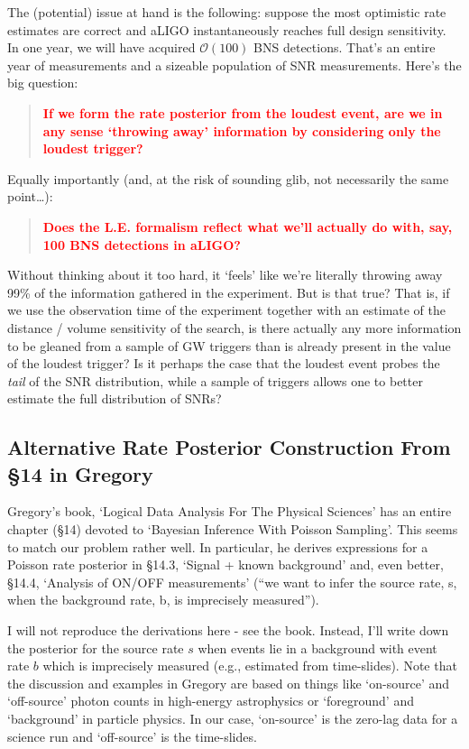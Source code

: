 \documentclass[nofootinbib]{revtex4}
\begin{document}
%
The (potential) issue at hand is the following: suppose the most
optimistic rate estimates are correct and aLIGO instantaneously reaches full
design sensitivity.  In one year, we will have acquired ${\mathcal O}(100)$ BNS
detections.  That's an entire year of measurements and a sizeable population of
SNR measurements.  Here's the big question: 
\begin{quote}
{\bf \textcolor{red}{If we form the rate
posterior from the loudest event, are we in any sense `throwing away'
information by considering only the loudest trigger?}}
\end{quote}
Equally importantly (and, at the risk of sounding glib, not necessarily the same
point\dots):
\begin{quote}
{\bf \textcolor{red}{Does the L.E. formalism reflect what we'll actually do
with, say, 100 BNS detections in aLIGO?}}
\end{quote}

Without thinking about it too hard, it `feels' like we're literally throwing
away 99\% of the information gathered in the experiment.  But is that true?
That is, if we use the observation time of the experiment together with an
estimate of the distance / volume sensitivity of the search, is there actually
any more information to be gleaned from a sample of GW triggers than is already
present in the value of the loudest trigger?  Is it perhaps the case that the
loudest event probes the \emph{tail} of the SNR distribution, while a sample
of triggers allows one to better estimate the full distribution of SNRs?

\subsection{Alternative Rate Posterior Construction From \S 14 in Gregory}
Gregory's book, `Logical Data Analysis For The Physical Sciences' has an entire
chapter (\S 14) devoted to `Bayesian Inference With Poisson Sampling'.  This
seems to match our problem rather well.  In particular, he derives expressions
for a Poisson rate posterior in \S 14.3, `Signal + known background' and, even
better, \S 14.4, `Analysis of ON/OFF measurements' (``we want to infer the
source rate, s, when the background rate, b, is imprecisely measured'').

I will not reproduce the derivations here - see the book.  Instead, I'll
write down the posterior for the source rate $s$ when events lie in a background
with event rate $b$ which is imprecisely measured (e.g., estimated from
time-slides).  Note that the discussion and examples in Gregory are based on
things like `on-source' and `off-source' photon counts in high-energy
astrophysics or `foreground' and `background' in particle physics.  In our case,
`on-source' is the zero-lag data for a science run and `off-source' is the
time-slides.
 
\end{document}
